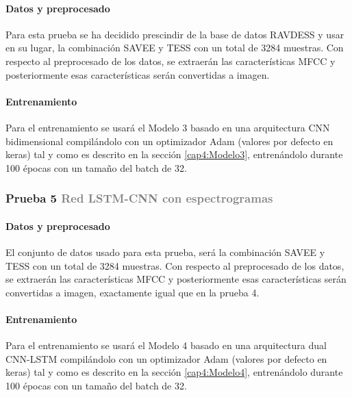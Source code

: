 \documentclass[11pt,a4paper,spanish]{book}
\begin{document}
	\setlength{\leftskip}{1cm}
		\paragraph{Datos y preprocesado} Para esta prueba se ha decidido prescindir de la base de datos RAVDESS y usar en su lugar, la combinación SAVEE y TESS con un total de 3284 muestras. Con respecto al preprocesado de los datos, se extraerán las características MFCC y posteriormente esas características serán convertidas a imagen.

		\paragraph{Entrenamiento} Para el entrenamiento se usará el Modelo 3 basado en una arquitectura CNN bidimensional compilándolo con un optimizador Adam (valores por defecto en keras) tal y como es descrito en la sección \ref{cap4:Modelo3}, entrenándolo durante 100 épocas con un tamaño del batch de 32.


	\subsubsection{\large Prueba 5 {\normalsize \textcolor{Gray}{Red LSTM-CNN con espectrogramas}}}
	
	\setlength{\leftskip}{1cm}
		\paragraph{Datos y preprocesado} El conjunto de datos usado para esta prueba, será la combinación SAVEE y TESS con un total de 3284 muestras. Con respecto al preprocesado de los datos, se extraerán las características MFCC y posteriormente esas características serán convertidas a imagen, exactamente igual que en la prueba 4.
		
		\paragraph{Entrenamiento} Para el entrenamiento se usará el Modelo 4 basado en una arquitectura dual CNN-LSTM compilándolo con un optimizador Adam (valores por defecto en keras) tal y como es descrito en la sección \ref{cap4:Modelo4}, entrenándolo durante 100 épocas con un tamaño del batch de 32.
		
\end{document}
